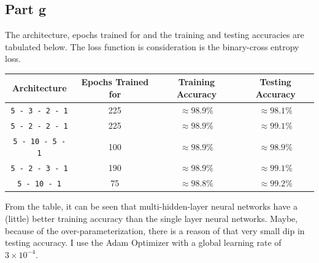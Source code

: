 \documentclass{article}
\begin{document}
\subsection*{Part g}
\begin{flushleft}
The architecture, epochs trained for and the training and testing accuracies are tabulated below. The loss function is consideration is the binary-cross entropy loss.
\begin{center}
\begin{tabular}{|c|c|c|c|}
\hline
Architecture & Epochs Trained for & Training Accuracy & Testing Accuracy \\
\hline
\texttt{5 - 3 - 2 - 1} & 225 & \(\approx 98.9\%\) & \(\approx 98.1\%\)\\
\hline
\texttt{5 - 2 - 2 - 1} & 225 & \(\approx 98.9\%\) & \(\approx 99.1\%\)\\
\hline
\texttt{5 - 10 - 5 - 1} & 100 & \(\approx 98.9\%\) & \(\approx 98.9\%\)\\
\hline
\texttt{5 - 2 - 3 - 1} & 190 & \(\approx 98.9\%\) & \(\approx 99.1\%\)\\
\hline
\texttt{5 - 10 - 1} & 75 & \(\approx 98.8\%\) & \(\approx 99.2\%\)\\
\hline
\end{tabular}
\end{center}

From the table, it can be seen that multi-hidden-layer neural networks have a (little) better training accuracy than the single layer neural networks. Maybe, because of the over-parameterization, there is a reason of that very small dip in testing accuracy. I use the Adam Optimizer with a global learning rate of \(3 \times 10^{-4}\).
\end{flushleft}
\end{document}
